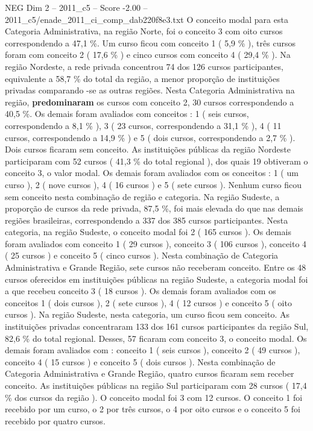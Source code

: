 \begin{textsample}{NEG Dim 2 – 2011\_c5 – Score -2.00 – 2011\_c5/enade\_2011\_ci\_comp\_dab220f8e3.txt}
O conceito modal para esta Categoria Administrativa, na região Norte, foi o conceito 3 com oito cursos correspondendo a 47,1 \%.
Um curso ficou com conceito 1 ( 5,9 \% ), três cursos foram com conceito 2 ( 17,6 \% ) e cinco cursos com conceito 4 ( 29,4 \% ).
Na região Nordeste, a rede privada concentrou 74 dos 126 cursos participantes, equivalente a 58,7 \% do total da região, a menor proporção de instituições privadas comparando -se as outras regiões.
Nesta Categoria Administrativa na região, \textbf{predominaram} os cursos com conceito 2, 30 cursos correspondendo a 40,5 \%.
Os demais foram avaliados com conceitos : 1 ( seis cursos, correspondendo a 8,1 \% ), 3 ( 23 cursos, correspondendo a 31,1 \% ), 4 ( 11 cursos, correspondendo a 14,9 \% ) e 5 ( dois cursos, correspondendo a 2,7 \% ).
Dois cursos ficaram sem conceito.
As instituições públicas da região Nordeste participaram com 52 cursos ( 41,3 \% do total regional ), dos quais 19 obtiveram o conceito 3, o valor modal.
Os demais foram avaliados com os conceitos : 1 ( um curso ), 2 ( nove cursos ), 4 ( 16 cursos ) e 5 ( sete cursos ).
Nenhum curso ficou sem conceito nesta combinação de região e categoria.
Na região Sudeste, a proporção de cursos da rede privada, 87,5 \%, foi mais elevada do que nas demais regiões brasileiras, correspondendo a 337 dos 385 cursos participantes.
Nesta categoria, na região Sudeste, o conceito modal foi 2 ( 165 cursos ).
Os demais foram avaliados com conceito 1 ( 29 cursos ), conceito 3 ( 106 cursos ), conceito 4 ( 25 cursos ) e conceito 5 ( cinco cursos ).
Nesta combinação de Categoria Administrativa e Grande Região, sete cursos não receberam conceito.
Entre os 48 cursos oferecidos em instituições públicas na região Sudeste, a categoria modal foi a que recebeu conceito 3 ( 18 cursos ).
Os demais foram avaliados com os conceitos 1 ( dois cursos ), 2 ( sete cursos ), 4 ( 12 cursos ) e conceito 5 ( oito cursos ).
Na região Sudeste, nesta categoria, um curso ficou sem conceito.
As instituições privadas concentraram 133 dos 161 cursos participantes da região Sul, 82,6 \% do total regional.
Desses, 57 ficaram com conceito 3, o conceito modal.
Os demais foram avaliados com : conceito 1 ( seis cursos ), conceito 2 ( 49 cursos ), conceito 4 ( 15 cursos ) e conceito 5 ( dois cursos ).
Nesta combinação de Categoria Administrativa e Grande Região, quatro cursos ficaram sem receber conceito.
As instituições públicas na região Sul participaram com 28 cursos ( 17,4 \% dos cursos da região ).
O conceito modal foi 3 com 12 cursos.
O conceito 1 foi recebido por um curso, o 2 por três cursos, o 4 por oito cursos e o conceito 5 foi recebido por quatro cursos.

\end{textsample}
